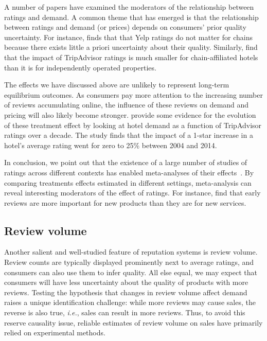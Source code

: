 \documentclass[letter,12pt]{article}
\begin{document}
A number of papers have examined the moderators of the relationship between
ratings and demand. A common theme that has emerged is that the relationship
between ratings and demand (or prices) depends on consumers' prior quality
uncertainty. For instance, \citet{luca2016reviews} finds that that Yelp
ratings do not matter for chains because there exists little a priori
uncertainty about their quality. Similarly, \citet{lewis2016welfare} find that
the impact of TripAdvisor ratings is much smaller for chain-affiliated hotels
than it is for independently operated properties.

The effects we have discussed above are unlikely to represent long-term
equilibrium outcomes. As consumers pay more attention to the increasing number
of reviews accumulating online, the influence of these reviews on demand and
pricing will also likely become stronger. \cite{lewis2016welfare} provide some
evidence for the evolution of these treatment effect by looking at hotel
demand as a function of TripAdvisor ratings over a decade. The study finds
that the impact of a 1-star increase in a hotel's average rating went for zero
to 25\% between 2004 and 2014.

In conclusion, we point out that the existence of a large number of studies of
ratings across different contexts has enabled meta-analyses of their
effects~\citep{floyd2014online,babic2016effect}. By comparing treatments
effects estimated in different settings, meta-analysis can reveal interesting
moderators of the effect of ratings. For instance, \cite{babic2016effect} find
that early reviews are more important for new products than they are for new
services.

\subsection{Review volume}

Another salient and well-studied feature of reputation systems is review
volume. Review counts are typically displayed prominently next to average
ratings, and consumers can also use them to infer quality. All else equal, we
may expect that consumers will have less uncertainty about the quality of
products with more reviews. Testing the hypothesis that changes in review
volume affect demand raises a unique identification challenge: while more
reviews may cause sales, the reverse is also true, \emph{i.e.}, sales can
result in more reviews. Thus, to avoid this reserve causality issue, reliable
estimates of review volume on sales have primarily relied on experimental
methods.
\end{document}
